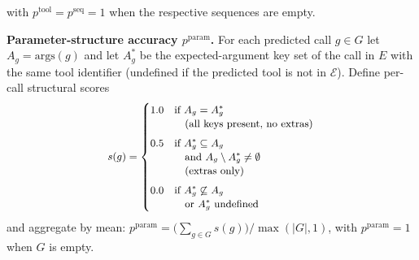 \noindent with $p^{\text{tool}} = p^{\text{seq}} = 1$ when the respective sequences are empty.

\noindent\textbf{Parameter-structure accuracy $p^{\text{param}}$.}
For each predicted call $g \in G$ let $A_g = \mathrm{args}(g)$ and let $A^{*}_{g}$ be the expected-argument key set of the call in $E$ with the same tool identifier (undefined if the predicted tool is not in $\mathcal{E}$). Define per-call structural scores
\vspace{-0.3cm}
\begin{equation}
\small
\begin{aligned}
s(g)=
\begin{cases}
1.0
& \text{if } A_g = A^{*}_{g}
\\[-1pt]
& \quad \text{(all keys present, no extras)}
\\[4pt]

0.5
& \text{if } A^{*}_{g} \subseteq A_g
\\[-1pt]
& \quad \text{and } A_g \setminus A^{*}_{g} \neq \emptyset
\\[-1pt]
& \quad \text{(extras only)}
\\[4pt]

0.0
& \text{if } A^{*}_{g} \not\subseteq A_g
\\[-1pt]
& \quad \text{or } A^{*}_{g}\ \text{undefined}
\end{cases}
\end{aligned}
\label{eq:prog-param-per-call}
\end{equation}
and aggregate by mean: $p^{\text{param}} = \bigl(\sum_{g \in G} s(g)\bigr) / \max(|G|, 1)$, with $p^{\text{param}} = 1$ when $G$ is empty.

